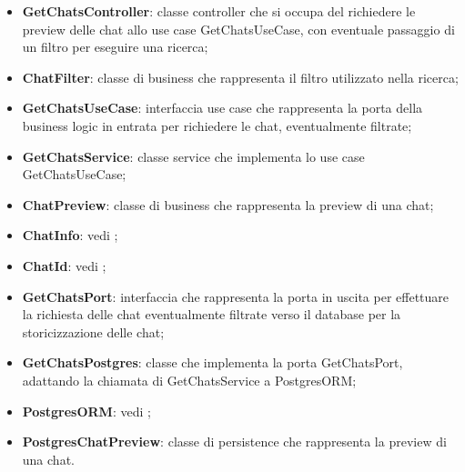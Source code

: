\documentclass[10pt, a4paper]{article}
\begin{document}
\begin{itemize}
    \item \label{GetChatsController}\textbf{GetChatsController}: classe controller che si occupa del richiedere le preview delle chat allo use case GetChatsUseCase, con eventuale passaggio di un filtro per eseguire una ricerca;
    \item \label{ChatFilter}\textbf{ChatFilter}: classe di business che rappresenta il filtro utilizzato nella ricerca;
    \item \label{GetChatsUseCase}\textbf{GetChatsUseCase}: interfaccia use case che rappresenta la porta della business logic in entrata per richiedere le chat, eventualmente filtrate;
    \item \label{GetChatsService}\textbf{GetChatsService}: classe service che implementa lo use case GetChatsUseCase;
    \item \label{ChatPreview}\textbf{ChatPreview}: classe di business che rappresenta la preview di una chat;
    \item \textbf{ChatInfo}: vedi ;
    \item \textbf{ChatId}: vedi ;
    \item \label{GetChatsPort}\textbf{GetChatsPort}: interfaccia che rappresenta la porta in uscita per effettuare la richiesta delle chat eventualmente filtrate verso il database per la storicizzazione delle chat;
    \item \label{GetChatsPostgres}\textbf{GetChatsPostgres}: classe che implementa la porta GetChatsPort, adattando la chiamata di GetChatsService a PostgresORM;
    \item \textbf{PostgresORM}: vedi ; 
    \item \label{PostgresChatPreview}\textbf{PostgresChatPreview}: classe di persistence che rappresenta la preview di una chat.
\end{itemize}
\end{document}
